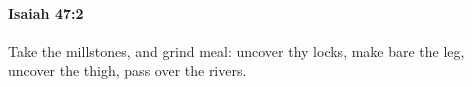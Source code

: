 
		\paragraph{Isaiah 47:2} %
			\label{ISAIAH-47-2}

			Take the millstones, and grind meal: uncover thy locks, make bare the leg, uncover the thigh, pass over the rivers.


